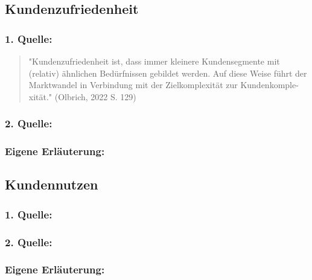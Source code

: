     \subsection{Kundenzufriedenheit}
        \subsubsection*{1. Quelle:}
        \begin{abstract}
            \noindent "Kundenzufriedenheit ist, dass immer kleinere Kundensegmente
            mit (relativ) ähnlichen Bedürfnissen gebildet werden. Auf diese Weise führt
            der Marktwandel in Verbindung mit der Zielkomplexität zur Kundenkomple-
            xität." (Olbrich, 2022 S. 129)
        \end{abstract}
        \subsubsection*{2. Quelle:}
        \begin{abstract}
        \end{abstract}
        \subsubsection*{Eigene Erläuterung:}
        \begin{abstract}
        \end{abstract}
    \subsection{Kundennutzen}
        \subsubsection*{1. Quelle:}
        \begin{abstract}
        \end{abstract}
        \subsubsection*{2. Quelle:}
        \begin{abstract}
        \end{abstract}
        \subsubsection*{Eigene Erläuterung:}
        \begin{abstract}
        \end{abstract}
